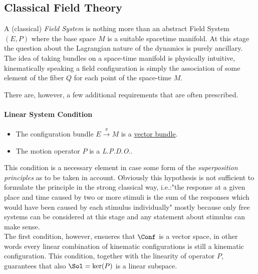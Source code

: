\documentclass[Main]{subfiles}
\begin{document}
	
	
		\subsection{Classical Field Theory}\label{Section:CFT}
		A (classical) \emph{Field System} is nothing more than an abstract Field System $(E,P)$ where the base space $M$  is a suitable spacetime manifold\cite{Bar}. At this stage the question about the Lagrangian nature of the dynamics is purely ancillary.
		\\		
		The idea of taking bundles on a space-time manifold is physically intuitive, kinematically speaking a field configuration is simply the association of some element of the fiber $Q $ for each point of the space-time $M$.
		
		There are, however, a few additional requirements that are often prescribed.
		\paragraph{Linear System Condition}		
			\begin{itemize}
				 \item The configuration bundle $E\xrightarrow{\pi} M$ is a \underline{vector bundle}.
				 \item The motion operator $P$ is a \emph{L.P.D.O.}.
			\end{itemize}
			This condition is a necessary element in case some form of the \emph{superposition principles} as to be taken in account. 
			Obviously this hypothesis is not sufficient to formulate the principle in the strong classical way, i.e.:"the response at a given place and time caused by two or more stimuli is the sum of the responses which would have been caused by each stimulus individually" mostly because only free systems can be considered at this stage and any statement about stimulus can make sense.
			\\
			The first condition, however, ensueres that $\Conf$ is a vector space, in other words every linear combination of kinematic configurations is still a kinematic configuration.
			This condition, together with the linearity of operator $P$,  guarantees that also $\Sol= \ker(P)$ is a linear subspace.		
			 
\end{document}
